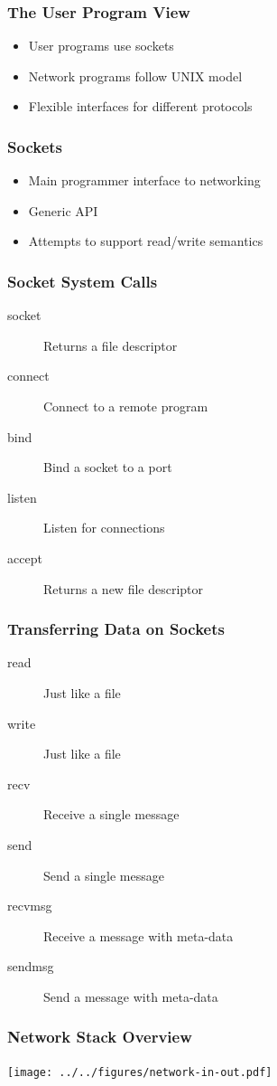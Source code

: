 \documentclass[pdftex]{beamer} %
\begin{document}
\begin{frame}
  \frametitle{The User Program View}
  \begin{itemize}
  \item User programs use sockets
  \item Network programs follow UNIX model
  \item Flexible interfaces for different protocols
  \end{itemize}
\end{frame}

\begin{frame}
  \frametitle{Sockets}
  \begin{itemize}
  \item Main programmer interface to networking
  \item Generic API
  \item Attempts to support read/write semantics
  \end{itemize}
\end{frame}

\begin{frame}
  \frametitle{Socket System Calls}
  \begin{description}
  \item [socket] Returns a file descriptor
  \item [connect] Connect to a remote program
  \item [bind] Bind a socket to a port
  \item [listen] Listen for connections
  \item [accept] Returns a new file descriptor
  \end{description}
\end{frame}

\begin{frame}
  \frametitle{Transferring Data on Sockets}
  \begin{description}
  \item [read] Just like a file
  \item [write] Just like a file
  \item [recv] Receive a single message
  \item [send] Send a single message
  \item [recvmsg] Receive a message with meta-data
  \item [sendmsg] Send a message with meta-data
  \end{description}
\end{frame}

\begin{frame}
  \frametitle{Network Stack Overview}
\centering
\texttt{[image: ../../figures/network-in-out.pdf]}
\end{frame}
\end{document}
